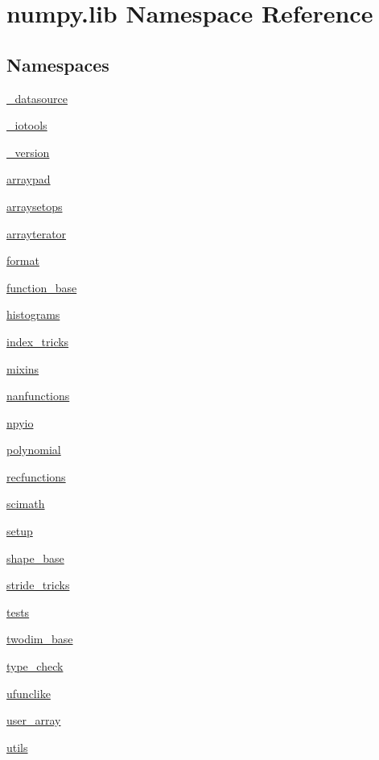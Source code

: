 \hypertarget{namespacenumpy_1_1lib}{}\section{numpy.\+lib Namespace Reference}
\label{namespacenumpy_1_1lib}
\subsection*{Namespaces}
\begin{DoxyCompactItemize}
\item 
 \hyperlink{namespacenumpy_1_1lib_1_1__datasource}{\+\_\+datasource}
\item 
 \hyperlink{namespacenumpy_1_1lib_1_1__iotools}{\+\_\+iotools}
\item 
 \hyperlink{namespacenumpy_1_1lib_1_1__version}{\+\_\+version}
\item 
 \hyperlink{namespacenumpy_1_1lib_1_1arraypad}{arraypad}
\item 
 \hyperlink{namespacenumpy_1_1lib_1_1arraysetops}{arraysetops}
\item 
 \hyperlink{namespacenumpy_1_1lib_1_1arrayterator}{arrayterator}
\item 
 \hyperlink{namespacenumpy_1_1lib_1_1format}{format}
\item 
 \hyperlink{namespacenumpy_1_1lib_1_1function__base}{function\+\_\+base}
\item 
 \hyperlink{namespacenumpy_1_1lib_1_1histograms}{histograms}
\item 
 \hyperlink{namespacenumpy_1_1lib_1_1index__tricks}{index\+\_\+tricks}
\item 
 \hyperlink{namespacenumpy_1_1lib_1_1mixins}{mixins}
\item 
 \hyperlink{namespacenumpy_1_1lib_1_1nanfunctions}{nanfunctions}
\item 
 \hyperlink{namespacenumpy_1_1lib_1_1npyio}{npyio}
\item 
 \hyperlink{namespacenumpy_1_1lib_1_1polynomial}{polynomial}
\item 
 \hyperlink{namespacenumpy_1_1lib_1_1recfunctions}{recfunctions}
\item 
 \hyperlink{namespacenumpy_1_1lib_1_1scimath}{scimath}
\item 
 \hyperlink{namespacenumpy_1_1lib_1_1setup}{setup}
\item 
 \hyperlink{namespacenumpy_1_1lib_1_1shape__base}{shape\+\_\+base}
\item 
 \hyperlink{namespacenumpy_1_1lib_1_1stride__tricks}{stride\+\_\+tricks}
\item 
 \hyperlink{namespacenumpy_1_1lib_1_1tests}{tests}
\item 
 \hyperlink{namespacenumpy_1_1lib_1_1twodim__base}{twodim\+\_\+base}
\item 
 \hyperlink{namespacenumpy_1_1lib_1_1type__check}{type\+\_\+check}
\item 
 \hyperlink{namespacenumpy_1_1lib_1_1ufunclike}{ufunclike}
\item 
 \hyperlink{namespacenumpy_1_1lib_1_1user__array}{user\+\_\+array}
\item 
 \hyperlink{namespacenumpy_1_1lib_1_1utils}{utils}
\end{DoxyCompactItemize}
